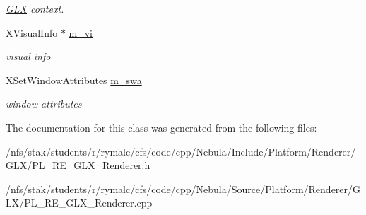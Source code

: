 \begin{DoxyCompactItemize}
\begin{DoxyCompactList}\small\item\em \hyperlink{namespacePlatform_1_1Renderer_1_1GLX}{GLX} context. \item\end{DoxyCompactList}\item 
\hypertarget{classPlatform_1_1Renderer_1_1GLX_1_1Renderer_a81fc68fd1da0a23da7f12aaaf82dc696}{
XVisualInfo $\ast$ \hyperlink{classPlatform_1_1Renderer_1_1GLX_1_1Renderer_a81fc68fd1da0a23da7f12aaaf82dc696}{m\_\-vi}}
\label{classPlatform_1_1Renderer_1_1GLX_1_1Renderer_a81fc68fd1da0a23da7f12aaaf82dc696}

\begin{DoxyCompactList}\small\item\em visual info \item\end{DoxyCompactList}\item 
\hypertarget{classPlatform_1_1Renderer_1_1GLX_1_1Renderer_a811d52fcc21243e0984412729d99e6c0}{
XSetWindowAttributes \hyperlink{classPlatform_1_1Renderer_1_1GLX_1_1Renderer_a811d52fcc21243e0984412729d99e6c0}{m\_\-swa}}
\label{classPlatform_1_1Renderer_1_1GLX_1_1Renderer_a811d52fcc21243e0984412729d99e6c0}

\begin{DoxyCompactList}\small\item\em window attributes \item\end{DoxyCompactList}\end{DoxyCompactItemize}


The documentation for this class was generated from the following files:\begin{DoxyCompactItemize}
\item 
/nfs/stak/students/r/rymalc/cfs/code/cpp/Nebula/Include/Platform/Renderer/GLX/PL\_\-RE\_\-GLX\_\-Renderer.h\item 
/nfs/stak/students/r/rymalc/cfs/code/cpp/Nebula/Source/Platform/Renderer/GLX/PL\_\-RE\_\-GLX\_\-Renderer.cpp\end{DoxyCompactItemize}
